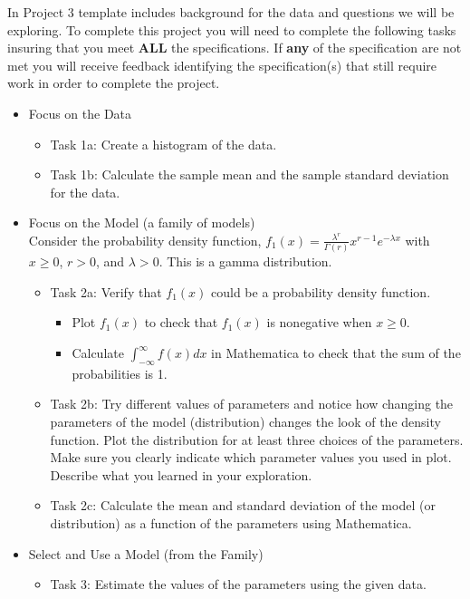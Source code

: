 \documentclass{article}
\theoremstyle{plain}
\theoremstyle{box}
\begin{document}
In Project 3 template includes background for the data and questions we will be exploring. To complete this project you will need to complete the following tasks insuring that you meet \textbf{ALL} the specifications. If \textbf{any} of the specification are not met you will receive feedback identifying the specification(s) that still require work in order to complete the project.

\begin{itemize}
\item Focus on the Data
	\begin{itemize}
	\item Task 1a: Create a histogram of the data.
	\item Task 1b: Calculate the sample mean and the sample standard deviation for the data.
	\end{itemize}
\item Focus on the Model (a family of models)\\
Consider the probability density function, $f_1(x) = \frac{\lambda^r}{\Gamma(r)}x^{r-1}e^{-\lambda x}$ with $x \geq 0$, $r>0$, and $\lambda > 0$. This is a gamma distribution. 
	\begin{itemize}
	\item Task 2a: Verify that $f_1(x)$ could be a probability density function.
		\begin{itemize}
		\item Plot $f_1(x)$ to check that $f_1(x)$ is nonegative when $x \geq 0$.
		\item Calculate $\int_{-\infty}^{\infty} f(x) dx$ in Mathematica to check that the sum of the probabilities is 1.
		\end{itemize}
	\item Task 2b: Try different values of parameters and notice how changing the parameters of the model (distribution) changes the look of the density function. Plot the distribution for at least three choices of the parameters.  Make sure you clearly indicate which parameter values you used in plot. Describe what you learned in your exploration. 	
	\item Task 2c: Calculate the mean and standard deviation of the model (or distribution) as a function of the parameters using Mathematica.
	\end{itemize}
\item Select and Use a Model (from the Family)
	\begin{itemize}
	\item Task 3: Estimate the values of the parameters using the given data.

\end{itemize}
\end{itemize}
\end{document}
